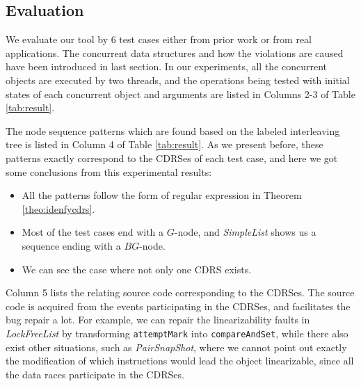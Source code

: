 \documentclass[runningheads]{llncs}
\begin{document}
\subsection{Evaluation}
We evaluate our tool by 6 test cases either from prior work or from real applications.
The concurrent data structures and how the violations are caused have been introduced in last section. 
In our experiments, all the concurrent objects are executed by two threads, and the operations being tested with initial states of 
each concurrent object and arguments are listed in Columns 2-3 of Table \ref{tab:result}. 







The node sequence patterns which are found based on the labeled interleaving tree is listed in Column 4 of Table \ref{tab:result}. 
As we present before, these patterns exactly correspond to the CDRSes of each test case, and here we got some conclusions from this experimental results:
\begin{itemize}
\item All the patterns follow the form of regular expression in Theorem \ref{theo:idenfycdrs}. 
\item Most of the test cases end with a $G$-node, and \textit{SimpleList} shows us a sequence ending with a $BG$-node.
\item We can see the case where not only one CDRS exists. 
\end{itemize}

Column 5 lists the relating source code corresponding to the CDRSes. The source code is acquired from the events participating in the CDRSes, and facilitates the bug repair a lot. For example, we can repair the linearizability faults in \textit{LockFreeList} by transforming \texttt{attemptMark} into \texttt{compareAndSet}, while there also exist other situations, such as \textit{PairSnapShot}, where we cannot point out exactly the modification of which instructions would lead the object linearizable, since all the data races participate in the CDRSes.

\end{document}
